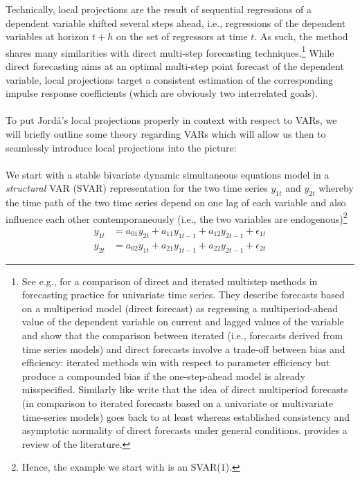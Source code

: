 \documentclass[a4paper,11pt,listof=nochaptergap,oneside,pointednumbers,bibtotoc,bigheadings,liststotoc]{scrbook}
\begin{document}
Technically, local projections are the result of sequential regressions of a dependent variable shifted several steps ahead, i.e., regressions of the dependent variables at horizon $t+h$ on the set of regressors at time $t$. As such, the method shares many similarities with direct multi-step forecasting techniques.\footnote{See e.g., \citet{marcellinoetal:06} for a comparison of direct and iterated multistep methods in forecasting practice for univariate time series. They describe forecasts based on a multiperiod model (direct forecast) as regressing a multiperiod-ahead value of the dependent variable on current and lagged values of the variable and show that the comparison between iterated (i.e., forecasts derived from time series models) and direct forecasts involve a trade-off between bias and efficiency: iterated methods win with respect to parameter efficiency but produce a compounded bias if the one-step-ahead model is already misspecified. Similarly like \citet{jorda:05} write that the idea of direct multiperiod forecasts (in comparison to iterated forecasts based on a univariate or multivariate time-series models) goes back to at least \citet{cox:61} whereas \citet{weiss:91} established consistency and asymptotic normality of direct forecasts under general conditions. \citet{bhansali:02} provides a review of the literature.} While direct forecasting aims at an optimal multi-step point forecast of the dependent variable, local projections target a consistent estimation of the corresponding impulse response coefficients (which are obviously two interrelated goals).\\
\\
To put Jordá's local projections properly in context with respect to VARs, we will briefly outline some theory regarding VARs which will allow us then to seamlessly introduce local projections into the picture:\\
\\
We start with a stable bivariate dynamic simultaneous equations model in a \textit{structural} VAR (SVAR) representation for the two time series $y_{1t}$ and $y_{2t}$ whereby the time path of the two time series depend on one lag of each variable and also influence each other contemporaneously (i.e., the two variables are endogenous)\footnote{Hence, the example we start with is an SVAR($1$).}
\begin{equation} \label{eq:svar1}
\begin{split}
	y_{1t} & = a_{01}y_{2t} + a_{11}y_{1t-1} + a_{12}y_{2t-1} + \epsilon_{1t} \\
	y_{2t} & = a_{02}y_{1t} + a_{21}y_{1t-1} + a_{22}y_{2t-1} + \epsilon_{2t}
\end{split}								
\end{equation}
\end{document}
